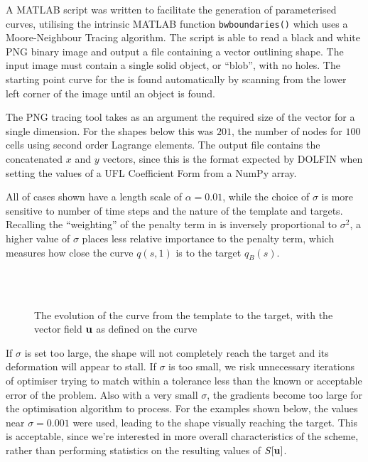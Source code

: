 \documentclass[a4paper, 12pt]{article}
\begin{document}
A MATLAB script was written to facilitate the generation of
parameterised curves, utilising the intrinsic MATLAB function \texttt{bwboundaries()}
\cite{gonzalez2004digital} which uses a Moore-Neighbour
Tracing algorithm. The script is able to read a black and white PNG binary image and
output a file containing a vector outlining shape. The input image
must contain a single solid object, or ``blob'', with no holes. The starting
point curve for the is found automatically by scanning from the lower left
corner of the image until an object is found.

The PNG tracing tool takes as an argument the required size of the vector for a
single dimension. For the shapes below this was $201$,  the number of nodes
for $100$ cells using second order Lagrange elements. The output file contains
the concatenated $x$ and $y$ vectors, since this is the format expected by
DOLFIN when setting the values of a UFL Coefficient Form from a NumPy array.

All of cases shown have a length scale of $\alpha = 0.01$, while the choice of
$\sigma$ is more sensitive to number of time steps and the nature of the
template and targets. Recalling the ``weighting'' of the penalty term in 
is inversely proportional to $\sigma^2$, a higher value of $\sigma$ places
less relative importance to the penalty term, which measures how close the curve $q(s,1)$ is
to the target $q_B(s)$.
\begin{figure}[h!]
  \centering
  \\
  \\
  \caption[Evolution of a curve from the template to target]{The evolution of the curve from the template to the target, with the vector
  field $\mathbf{u}$ as defined on the curve}
  \label{fig:vectors}
\end{figure}

If $\sigma$ is set too large, the shape will not completely reach the target and
its deformation will appear to stall. If $\sigma$ is too small, we risk
unnecessary iterations of optimiser trying to match within a tolerance less than
the known or acceptable error of the problem.  Also with a very small
$\sigma$, the gradients become too large for the optimisation algorithm to
process. For the examples shown below, the values near $\sigma = 0.001$
were used, leading to the shape visually reaching the target. This is acceptable, since
we're interested in more overall characteristics of the scheme, rather than
performing statistics on the resulting values of $S[\mathbf{u}]$.
\end{document}
